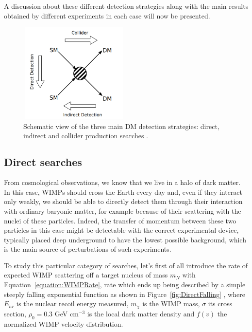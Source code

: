 \documentclass[a4paper, 10pt, openright]{report}
\begin{document}
A discussion about these different detection strategies along with the main results obtained by different experiments in each case will now be presented.

\begin{figure}[htbp]
\begin{center}
\includegraphics[width=5.5cm, height=5cm]{figs/ThreeWays.png}
\caption{Schematic view of the three main \ac{DM} detection strategies: direct, indirect and collider production searches \cite{ColliderSearches}.}
\label{fig:ThreeWays}
\end{center}
\end{figure}

\subsection{Direct searches} \label{subsection:DirectSearches}

From cosmological observations, we know that we live in a halo of dark matter. In this case, \ac{WIMP}s should cross the Earth every day and, even if they interact only weakly, we should be able to directly detect them through their interaction with ordinary baryonic matter, for example because of their scattering with the nuclei of these particles. Indeed, the transfer of momentum between these two particles in this case might be detectable with the correct experimental device, typically placed deep underground to have the lowest possible background, which is the main source of perturbations of such experiments. 

To study this particular category of searches, let's first of all introduce the rate of expected WIMP scattering off a target nucleus of mass $m_N$ with Equation~\ref{equation:WIMPRate}, rate which ends up being described by a simple steeply
falling exponential function as shown in Figure~\ref{fig:DirectFalling} \cite{DirectSearches}, where $E_{nr}$ is the nuclear recoil energy measured, $m_\chi$ is the \ac{WIMP} mass, $\sigma$ its cross section, $\rho_0 = 0.3$ GeV cm$^{-3}$ is the local dark matter density and $f(v)$ the normalized \ac{WIMP} velocity distribution.
\end{document}
